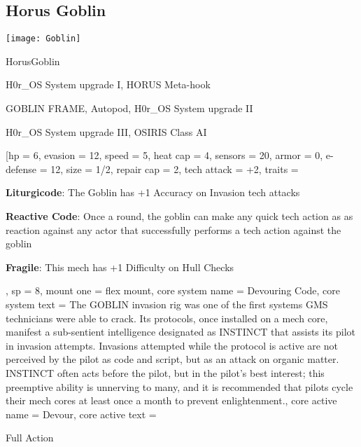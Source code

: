 \subsection{Horus Goblin}

\begin{center}
    \texttt{[image: Goblin]}
\end{center}

\begin{mech}{Horus}{Goblin}


\begin{license}
\item H0r\_OS System upgrade I, HORUS Meta-hook
\item GOBLIN FRAME, Autopod, H0r\_OS System upgrade II
\item H0r\_OS System upgrade III, OSIRIS Class AI
\end{license}


\frameBox
[hp = 6,
evasion = 12,
speed = 5,
heat cap = 4,
sensors = 20,
armor = 0,
e-defense = 12,
size = 1/2,
repair cap = 2,
tech attack = +2,
traits = {
  \textbf{Liturgicode}: The Goblin has +1 Accuracy on Invasion tech attacks

  \textbf{Reactive Code}: Once a round, the goblin can make any quick tech action as as reaction against any actor that successfully performs a tech action against the goblin

  \textbf{Fragile}: This mech has +1 Difficulty on Hull Checks
  },
sp = 8,
mount one = flex mount,
core system name = Devouring Code,
core system text = {The GOBLIN invasion rig was one of the first systems GMS technicians were able to crack. Its protocols, once installed on a mech core, manifest a sub-sentient intelligence designated as INSTINCT that assists its pilot in invasion attempts. Invasions attempted while the protocol is active are not perceived by the pilot as code and script, but as an attack on organic matter. INSTINCT often acts before the pilot, but in the pilot’s best interest; this preemptive ability is unnerving to many, and it is recommended that pilots cycle their mech cores at least once a month to prevent enlightenment.},
core active name = Devour,
core active text = {Full Action

}
\end{mech}
